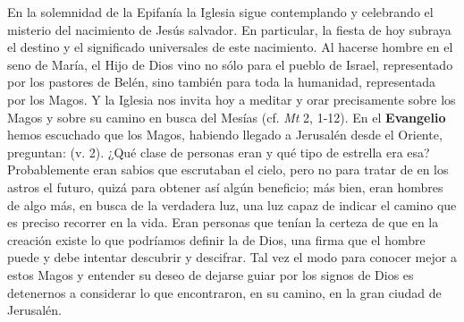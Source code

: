 \begin{body}
\begin{body}
{En la solemnidad de la Epifanía la Iglesia sigue contemplando y celebrando el misterio del nacimiento de Jesús salvador. En particular, la fiesta de hoy subraya el destino y el significado universales de este nacimiento. Al hacerse hombre en el seno de María, el Hijo de Dios vino no sólo para el pueblo de Israel, representado por los pastores de Belén, sino también para toda la humanidad, representada por los Magos. Y la Iglesia nos invita hoy a meditar y orar precisamente sobre los Magos y sobre su camino en busca del Mesías (cf. \emph{Mt} 2, 1-12). En el \textbf{Evangelio} hemos escuchado que los Magos, habiendo llegado a Jerusalén desde el Oriente, preguntan:  (v. 2). ¿Qué clase de personas eran y qué tipo de estrella era esa? Probablemente eran sabios que escrutaban el cielo, pero no para tratar de  en los astros el futuro, quizá para obtener así algún beneficio; más bien, eran hombres  de algo más, en busca de la verdadera luz, una luz capaz de indicar el camino que es preciso recorrer en la vida. Eran personas que tenían la certeza de que en la creación existe lo que podríamos definir la  de Dios, una firma que el hombre puede y debe intentar descubrir y descifrar. Tal vez el modo para conocer mejor a estos Magos y entender su deseo de dejarse guiar por los signos de Dios es detenernos a considerar lo que encontraron, en su camino, en la gran ciudad de Jerusalén.

}
\end{body}
\end{body}
